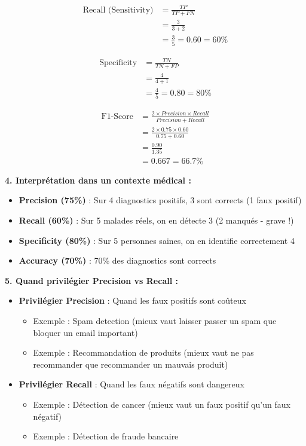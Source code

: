 \documentclass[11pt,a4paper]{article}
\begin{document}
\begin{solutionbox}
\begin{align*}
\text{Recall (Sensitivity)} &= \frac{TP}{TP + FN} \\
                            &= \frac{3}{3 + 2} \\
                            &= \frac{3}{5} = 0.60 = 60\%
\end{align*}

\begin{align*}
\text{Specificity} &= \frac{TN}{TN + FP} \\
                  &= \frac{4}{4 + 1} \\
                  &= \frac{4}{5} = 0.80 = 80\%
\end{align*}

\begin{align*}
\text{F1-Score} &= \frac{2 \times Precision \times Recall}{Precision + Recall} \\
               &= \frac{2 \times 0.75 \times 0.60}{0.75 + 0.60} \\
               &= \frac{0.90}{1.35} \\
               &= 0.667 = 66.7\%
\end{align*}

\textbf{4. Interprétation dans un contexte médical :}
\begin{itemize}
    \item \textbf{Precision (75\%)} : Sur 4 diagnostics positifs, 3 sont corrects (1 faux positif)
    \item \textbf{Recall (60\%)} : Sur 5 malades réels, on en détecte 3 (2 manqués - grave !)
    \item \textbf{Specificity (80\%)} : Sur 5 personnes saines, on en identifie correctement 4
    \item \textbf{Accuracy (70\%)} : 70\% des diagnostics sont corrects
\end{itemize}

\textbf{5. Quand privilégier Precision vs Recall :}
\begin{itemize}
    \item \textbf{Privilégier Precision} : Quand les faux positifs sont coûteux
    \begin{itemize}
        \item Exemple : Spam detection (mieux vaut laisser passer un spam que bloquer un email important)
        \item Exemple : Recommandation de produits (mieux vaut ne pas recommander que recommander un mauvais produit)
    \end{itemize}
    \item \textbf{Privilégier Recall} : Quand les faux négatifs sont dangereux
    \begin{itemize}
        \item Exemple : Détection de cancer (mieux vaut un faux positif qu'un faux négatif)
        \item Exemple : Détection de fraude bancaire
    \end{itemize}
\end{itemize}
\end{solutionbox}
\end{document}

